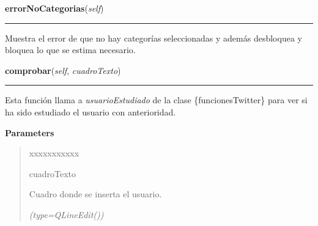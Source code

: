     \vspace{0.5ex}

\hspace{.8\funcindent}\begin{boxedminipage}{\funcwidth}

    \raggedright \textbf{errorNoCategorias}(\textit{self})

    \vspace{-1.5ex}

    \rule{\textwidth}{0.5\fboxrule}
\setlength{\parskip}{2ex}
    Muestra el error de que no hay categorías seleccionadas y además 
    desbloquea y bloquea lo que se estima necesario.

\setlength{\parskip}{1ex}
    \end{boxedminipage}

    \label{manejoGrafo:ManejoGrafo:comprobar}

    \vspace{0.5ex}

\hspace{.8\funcindent}\begin{boxedminipage}{\funcwidth}

    \raggedright \textbf{comprobar}(\textit{self}, \textit{cuadroTexto})

    \vspace{-1.5ex}

    \rule{\textwidth}{0.5\fboxrule}
\setlength{\parskip}{2ex}
    Esta función llama a \textit{usuarioEstudiado} de la clase 
    \{funcionesTwitter\} para ver si ha sido estudiado el usuario con 
    anterioridad.

\setlength{\parskip}{1ex}
      \textbf{Parameters}
      \vspace{-1ex}

      \begin{quote}
        \begin{Ventry}{xxxxxxxxxxx}

          \item[cuadroTexto]

          Cuadro donde se inserta el usuario.

            {\it (type=QLineEdit())}

        \end{Ventry}

      \end{quote}

    \end{boxedminipage}

